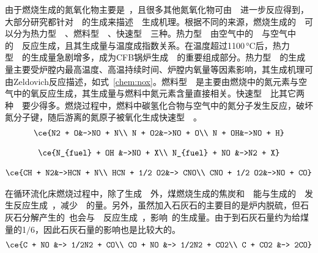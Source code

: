 由于燃烧生成的氮氧化物主要是~，且很多其他氮氧化物可由~~进一步反应得到，大部分研究都针对~~的生成来描述~~生成机理。根据不同的来源，燃烧生成的~~可以分为热力型~~、燃料型~~、快速型~~三种。热力型~~由空气中的~~与空气中的~~反应生成，且其生成量与温度成指数关系。在温度超过1100$\,$\si{\degreeCelsius}后，热力型~~的生成量急剧增多，成为CFB锅炉生成~~的重要组成部分。热力型~~的生成量主要受炉膛内最高温度、高温持续时间、炉膛内氧量等因素影响，其生成机理可由Zeldovich反应描述，如式~\ref{chem:nox}\cite{Agency1999Nitrogen}。燃料型~~是主要由燃烧中的氮元素与空气中的氧反应生成，其生成量与燃料中氮元素含量直接相关。快速型~~比其它两种~~要少得多。燃烧过程中，燃料中碳氢化合物与空气中的氮分子发生反应，破坏氮分子键，随后游离的氮原子被氧化生成快速型~~。
\begin{align}
\label{chem:nox}
\begin{split}
\ce{N2 + O&->NO + N\\
N + O2&->NO + O\\
N + OH&->NO + H}
\end{split}
\end{align}

\begin{align}
\begin{split}
\ce{N_{fuel} + OH &->NO + X\\
N_{fuel} + NO &->N2 + X}
\end{split}
\end{align}


\begin{align}
\begin{split}
\ce{CH + N2&->HCN + N\\
HCN + 1/2 O2&-> CNO\\
CNO + 1/2 O2&->NO + CO}
\end{split}
\end{align}

在循环流化床燃烧过程中，除了生成~~外，煤燃烧生成的焦炭和~~能与生成的~~发生反应生成~，减少~~的量。另外，虽然加入石灰石的主要目的是炉内脱硫，但石灰石分解产生的~也会与~~反应生成~，影响~的生成量。由于到石灰石量约为给煤量的1$/$6，因此石灰石量的影响也是比较大的。
\begin{align}
\begin{split}
\ce{C + NO &-> 1/2N2 + CO\\
CO + NO &-> 1/2N2 + CO2\\
C + CO2 &-> 2CO}
\end{split}
\end{align}

